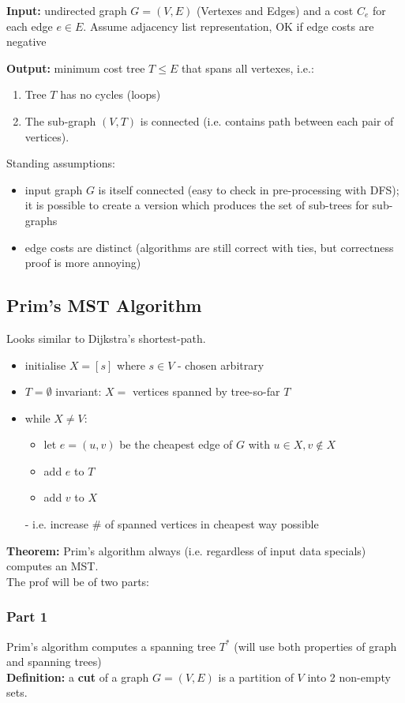 \documentclass{scrartcl}
\begin{document}
{\bf Input: } undirected graph $G = (V, E)$ (Vertexes and Edges) and a cost
$C_e$ for each edge $e \in E$. Assume adjacency list representation, OK if edge
costs are negative

{\bf Output: } minimum cost tree $T \leq E$ that spans all vertexes, i.e.:
\begin{enumerate}
\item Tree $T$ has no cycles (loops)
\item The sub-graph $(V, T)$ is connected (i.e. contains path between each pair
  of vertices).
\end{enumerate}
Standing assumptions:
\begin{itemize}
\item input graph $G$ is itself connected (easy to check in pre-processing with
  DFS); it is possible to create a version which produces the set of sub-trees
  for sub-graphs
\item edge costs are distinct (algorithms are still correct with ties, but
  correctness proof is more annoying)
\end{itemize}

\subsection{Prim's MST Algorithm}
\label{sec:5-2}
Looks similar to Dijkstra's shortest-path.
\begin{itemize}
\item initialise $X = [s]$ where $s \in V$ - chosen arbitrary
\item $T = \emptyset$ invariant: $X = $ vertices spanned by tree-so-far $T$
\item while $X \neq V$:
  \begin{itemize}
  \item let $e = (u, v)$ be the cheapest edge of $G$ with $u \in X, v \notin X$
  \item add $e$ to $T$
  \item add $v$ to $X$
  \end{itemize}
  - i.e. increase \# of spanned vertices in cheapest way possible
\end{itemize} {\bf Theorem: } Prim's algorithm always (i.e. regardless of input
data specials)
computes an MST. \\
The prof will be of two parts:
\subsubsection*{Part 1 } Prim's algorithm computes a spanning tree $T^*$
(will use both properties of graph and spanning trees)\\
{\bf Definition: } a {\bf cut} of a graph $G = (V, E)$ is a partition of $V$
into 2 non-empty sets.\\
\end{document}
